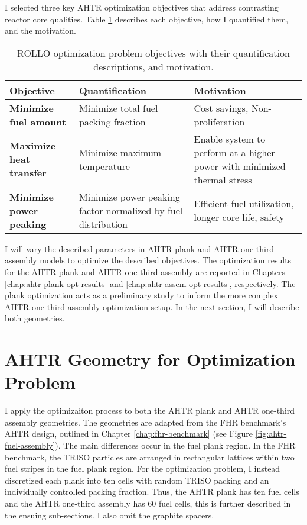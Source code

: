 I selected three key \gls{AHTR} optimization objectives that address contrasting reactor 
core qualities. 
Table \ref{tab:objectives} describes each objective, how I quantified them, and the motivation.
\begin{table}[htbp]
    \centering
    \onehalfspacing
    \caption{\acrfull{ROLLO} optimization problem objectives with their quantification 
    descriptions, and motivation.}
	\label{tab:objectives}
    \footnotesize
    \begin{tabular}{p{4.5cm}|p{5cm}p{5cm}}
    \hline 
    \textbf{Objective}& \textbf{Quantification}& \textbf{Motivation} \\
    \hline
    \textbf{Minimize fuel amount} & Minimize total fuel packing fraction & Cost savings, Non-proliferation \\ 
    \hline
    \textbf{Maximize heat transfer} & Minimize maximum temperature & Enable system to perform at a higher power with minimized thermal stress \\
    \hline
    \textbf{Minimize power peaking} & Minimize power peaking factor normalized by fuel distribution & Efficient fuel utilization, longer core life, safety\\
    \hline
    \end{tabular}
\end{table}

I will vary the described parameters in \gls{AHTR} plank and \gls{AHTR} one-third assembly 
models to optimize the described objectives.
The optimization results for the \gls{AHTR} plank and \gls{AHTR} one-third assembly are 
reported in Chapters \ref{chap:ahtr-plank-opt-results} and \ref{chap:ahtr-assem-opt-results}, 
respectively. 
The plank optimization acts as a preliminary study to inform the more complex \gls{AHTR} 
one-third assembly optimization setup. 
In the next section, I will describe both geometries. 

\section{AHTR Geometry for Optimization Problem}
I apply the optimizaiton process to both the \gls{AHTR} plank and \gls{AHTR} one-third
assembly geometries.
The geometries are adapted from the \gls{FHR} benchmark's \gls{AHTR} design,
outlined in Chapter \ref{chap:fhr-benchmark} (see Figure \ref{fig:ahtr-fuel-assembly}).
The main differences occur in the fuel plank region. 
In the \gls{FHR} benchmark, the TRISO particles are arranged in rectangular lattices within
two fuel stripes in the fuel plank region. 
For the optimization problem, I instead discretized each plank into ten cells with random 
TRISO packing and an individually controlled packing fraction. 
Thus, the \gls{AHTR} plank has ten fuel cells and the \gls{AHTR}  one-third assembly has 
60 fuel cells, this is further described in the ensuing sub-sections.  
I also omit the graphite spacers. 

